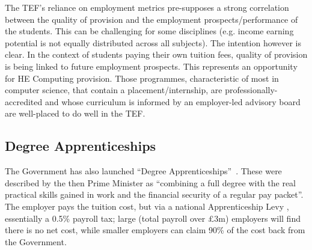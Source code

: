 \documentclass[conference]{IEEEtran}
\begin{document}

The TEF's reliance on employment metrics pre-supposes a strong
correlation between the quality of provision and the employment
prospects/performance of the students. This can be challenging for
some disciplines (e.g. income earning potential is not equally
distributed across all subjects). The intention however is clear. In
the context of students paying their own tuition fees, quality of
provision is being linked to future employment prospects. This
represents an opportunity for HE Computing provision. Those
programmes, characteristic of most in computer science, that contain a
placement/internship, are professionally-accredited and whose
curriculum is informed by an employer-led advisory board are
well-placed to do well in the TEF.

\subsection{Degree Apprenticeships}\label{sec:DA}

The Government has also launched ``Degree
Apprenticeships''~\cite{BIS2015a}. These were described by the then
Prime Minister as ``combining a full degree with the real practical
skills gained in work and the financial security of a regular pay
packet''. The employer pays the tuition cost, but via a national
Apprenticeship Levy \cite{HMRC2016a}, essentially a 0.5\% payroll tax;
large (total payroll over \pounds3m) employers will find there is no net
cost, while smaller employers can claim 90\% of the cost back from the
Government.
\end{document}
